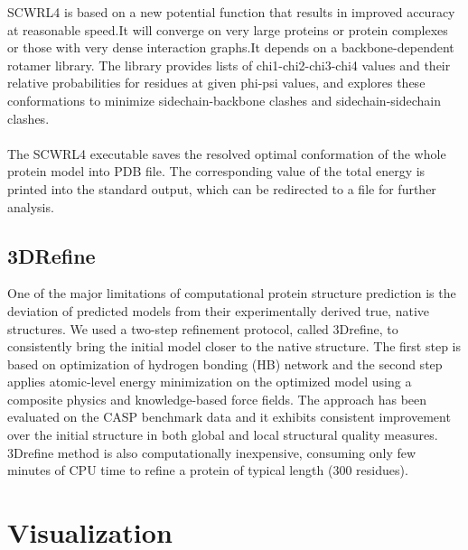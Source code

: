 \documentclass{article}
\begin{document}
SCWRL4 is based on a new potential function that results in improved accuracy at reasonable speed.It will converge on very large proteins or protein complexes or those with very dense interaction graphs.It depends on a backbone-dependent rotamer library. The library provides lists of chi1-chi2-chi3-chi4 values and their relative probabilities for residues at given phi-psi values, and explores these conformations to minimize sidechain-backbone clashes and sidechain-sidechain clashes.\\\\

The SCWRL4 executable saves the resolved optimal conformation of the whole protein model into PDB file. The corresponding value of the total energy is printed into the standard output, which can be redirected to a file for further analysis.

\subsection{3DRefine}

One of the major limitations of computational protein structure prediction is the deviation of predicted models from their experimentally derived true, native structures.
	We used a two-step refinement protocol, called 3Drefine, to consistently bring the initial model closer to the native structure. The first step is based on optimization of hydrogen bonding (HB) network and the second step applies atomic-level energy minimization on the optimized model using a composite physics and knowledge-based force fields. The approach has been evaluated on the CASP benchmark data and it exhibits consistent improvement over the initial structure in both global and local structural quality measures. 3Drefine method is also computationally inexpensive, consuming only few minutes of CPU time to refine a protein of typical length (300 residues).

\section{Visualization}
\end{document}

